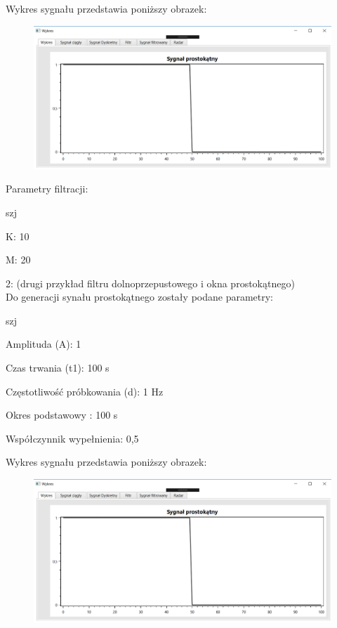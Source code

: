 \documentclass[12pt]{article}
\begin{document}
Wykres sygnału przedstawia poniższy obrazek:
\begin{figure}[h!]
 \centering
 \includegraphics[width=12.3cm]{prost.PNG}
 \vspace{-0.3cm}
 \label{gw}
\end{figure}

Parametry filtracji:

\begin{labeling}{szj}
\item [K:] 10
\item [M:] 20 
\end{labeling}

2: (drugi przykład filtru dolnoprzepustowego i okna prostokątnego)
\\Do generacji synału prostokątnego zostały podane parametry:

\begin{labeling}{szj}
\item [Amplituda (A):] 1
\item [Czas trwania (t1):] 100 s
\item [Częstotliwość próbkowania (d): ] 1 Hz
\item [Okres podstawowy :] 100 s
\item [Współczynnik wypełnienia:] 0,5
\end{labeling}

Wykres sygnału przedstawia poniższy obrazek:
\begin{figure}[h!]
 \centering
 \includegraphics[width=12.3cm]{prost.PNG}
 \vspace{-0.3cm}
 \label{gw}
\end{figure}
\end{document}
